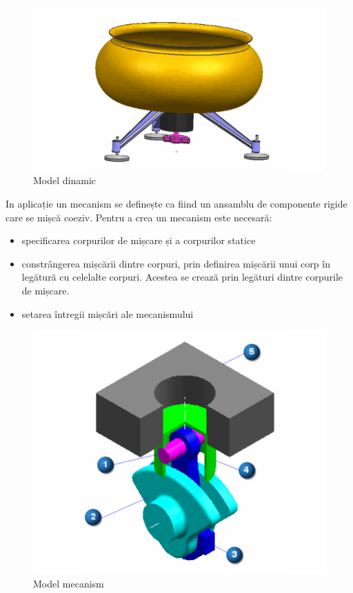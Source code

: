 \begin{figure}[H]
    \begin{center}
        \includegraphics[scale=0.7]{imagini/simcenter/dinamic.png}
        \caption{Model dinamic \protect\footnotemark}
        \label{fig:dinamic}
    \end{center}    
\end{figure}


In aplicație un mecanism se definește ca fiind un ansamblu de componente rigide care se mișcă coeziv. 
Pentru a crea un mecanism este necesară:
\begin{itemize}
    \item specificarea corpurilor de mișcare și a corpurilor statice
    \item constrângerea mișcării dintre corpuri, prin definirea mișcării unui corp în legătură cu celelalte corpuri. 
    Acestea se crează prin legături dintre corpurile de mișcare.
    \item setarea întregii mișcări ale mecanismului
\end{itemize}

\begin{figure}[H]
    \begin{center}
        \includegraphics[scale=0.7]{imagini/simcenter/mecanism.png}
        \caption{Model mecanism \protect\footnotemark}
        \label{fig:mecanism_simplu}
    \end{center}    
\end{figure}

